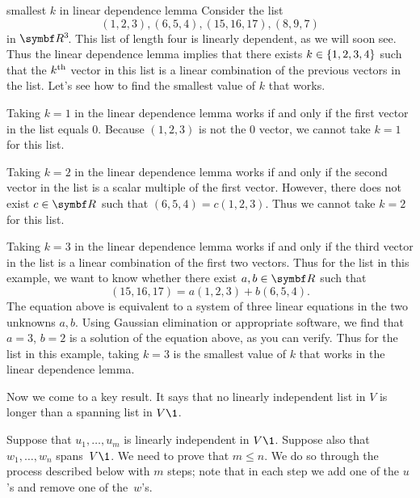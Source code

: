 \begin{example}{smallest\/ $k$ in linear dependence lemma}
Consider the list
\[
(1, 2, 3), (6, 5,4), (15, 16, 17), (8, 9, 7)
\]
in $\RR3$. This list of length four is linearly dependent, as we will soon see. Thus the linear dependence lemma implies that there exists
$k \in \{1, 2, 3, 4\}$ such that the $k^{\text{{th}}}$ vector in this list is a linear combination of the previous vectors in the list. Let's see how to find the smallest value of $k$ that works.

Taking $k = 1$ in the linear dependence lemma works if and only if the first vector in the list equals $0$. Because $(1, 2, 3)$ is not the $0$ vector, we cannot take $k = 1$ for this list.

Taking $k = 2$ in the linear dependence lemma works if and only if the second vector in the list is a scalar multiple of the first vector. However, there does not exist $c \in \R{}$ such that $(6, 5, 4) = c(1, 2, 3)$. Thus we cannot take $k = 2$ for this list.

Taking $k = 3$ in the linear dependence lemma works if and only if the third vector in the list is a linear combination of the first two vectors. Thus for the list in this example, we want to know whether there exist $a, b \in \R{}$ such that
\[
(15, 16, 17) = a (1, 2,3) + b(6, 5,4).
\]
The equation above is equivalent to a system of three linear equations in the two unknowns $a, b$. Using Gaussian elimination or appropriate software, we find that $a = 3$, $b = 2$ is a solution of the equation above, as you can verify. Thus for the list in this example, taking $k=3$ is the smallest value of $k$ that works in the linear dependence lemma.
\end{example}

Now we come to a key result.  It says that no linearly independent
list in $V$ is longer than a spanning list in $V\1$.


\proof
Suppose that $u_1, \dots, u_m$ is linearly independent in $V\1$. Suppose also that
$w_1, \dots, w_n$ spans~$V\1$.  We need to prove that $m \le n$.  We do so
through the process described below with $m$ steps; note that in each step we add
one of the $u$'s and remove one of the~$w$'s.

